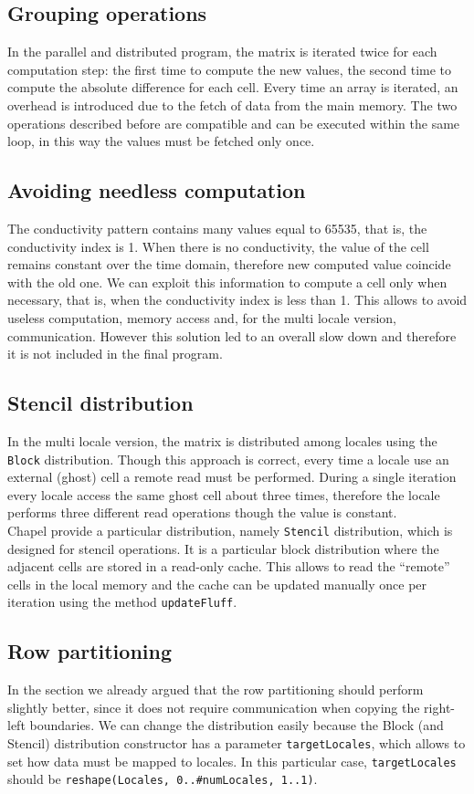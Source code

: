 \documentclass{article}
\begin{document}
\subsection{Grouping operations}
In the parallel and distributed program, the matrix is iterated twice for each computation step: the first time to compute the new values, the second time to compute the absolute difference for each cell. Every time an array is iterated, an overhead is introduced due to the fetch of data from the main memory. The two operations described before are compatible and can be executed within the same loop, in this way the values must be fetched only once.

\subsection{Avoiding needless computation}
The conductivity pattern contains many values equal to 65535, that is, the conductivity index is 1. When there is no conductivity, the value of the cell remains constant over the time domain, therefore new computed value coincide with the old one. We can exploit this information to compute a cell only when necessary, that is, when the conductivity index is less than 1. This allows to avoid useless computation, memory access and, for the multi locale version, communication. However this solution led to an overall slow down and therefore it is not included in the final program.

\subsection{Stencil distribution}
In the multi locale version, the matrix is distributed among locales using the \texttt{Block} distribution. Though this approach is correct, every time a locale use an external (ghost) cell a remote read must be performed. During a single iteration every locale access the same ghost cell about three times, therefore the locale performs three different read operations though the value is constant. \\
Chapel provide a particular distribution, namely \texttt{Stencil} distribution, which is designed for stencil operations. It is a particular block distribution where the adjacent cells are stored in a read-only cache. This allows to read the “remote” cells in the local memory and the cache can be updated manually once per iteration using the method \texttt{updateFluff}.

\subsection{Row partitioning}
In the section  we already argued that the row partitioning should perform slightly better, since it does not require communication when copying the right-left boundaries. We can change the distribution easily because the Block (and Stencil) distribution constructor has a parameter \texttt{targetLocales}, which allows to set how data must be mapped to locales. In this particular case, \texttt{targetLocales} should be \texttt{reshape(Locales, {0..\#numLocales, 1..1})}.
\end{document}
